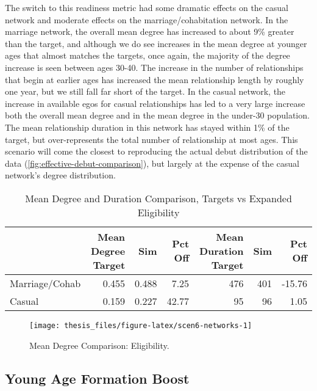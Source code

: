 \documentclass [11pt, proquest] {uwthesis}[2015/03/03]
\begin{document}
The switch to this readiness metric had some dramatic effects on the casual network and moderate effects on the marriage/cohabitation network. In the marriage network, the overall mean degree has increased to about 9\% greater than the target, and although we do see increases in the mean degree at younger ages that almost matches the targets, once again, the majority of the degree increase is seen between ages 30-40. The increase in the number of relationships that begin at earlier ages has increased the mean relationship length by roughly one year, but we still fall far short of the target. In the casual network, the increase in available egos for casual relationships has led to a very large increase both the overall mean degree and in the mean degree in the under-30 population. The mean relationship duration in this network has stayed within 1\% of the target, but over-represents the total number of relationship at most ages. This scenario will come the closest to reproducing the actual debut distribution of the data (\ref{fig:effective-debut-comparison}), but largely at the expense of the casual network's degree distribution.
\begin{table}

\caption{\label{tab:scen6-tab}Mean Degree and Duration Comparison, Targets vs Expanded Eligibility}
\centering
\begin{tabular}[t]{lrrrrrr}
\toprule
  & Mean Degree Target & Sim & Pct Off & Mean Duration Target & Sim & Pct Off\\
\midrule
Marriage/Cohab & 0.455 & 0.488 & 7.25 & 476 & 401 & -15.76\\
Casual & 0.159 & 0.227 & 42.77 & 95 & 96 & 1.05\\
\bottomrule
\end{tabular}
\end{table}
\begin{figure}

{\centering \texttt{[image: thesis\_files/figure-latex/scen6-networks-1]} 

}

\caption{Mean Degree Comparison: Eligibility.}\label{fig:scen6-networks}
\end{figure}
\hypertarget{young-age-formation-boost}{%
\subsection{Young Age Formation Boost}\label{young-age-formation-boost}}
\end{document}
